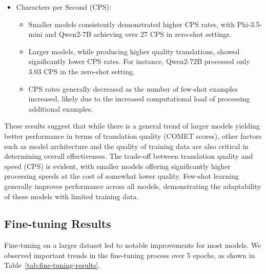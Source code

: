 \documentclass[conference]{IEEEtran}
\begin{document}
\begin{itemize}
    \item Characters per Second (CPS):
    \begin{itemize}
        \item Smaller models consistently demonstrated higher CPS rates, with Phi-3.5-mini and Qwen2-7B achieving over 27 CPS in zero-shot settings.
        \item Larger models, while producing higher quality translations, showed significantly lower CPS rates. For instance, Qwen2-72B processed only 3.03 CPS in the zero-shot setting.
        \item CPS rates generally decreased as the number of few-shot examples increased, likely due to the increased computational load of processing additional examples.
    \end{itemize}
\end{itemize}

These results suggest that while there is a general trend of larger models yielding better performance in terms of translation quality (COMET scores), other factors such as model architecture and the quality of training data are also critical in determining overall effectiveness. The trade-off between translation quality and speed (CPS) is evident, with smaller models offering significantly higher processing speeds at the cost of somewhat lower quality. Few-shot learning generally improves performance across all models, demonstrating the adaptability of these models with limited training data.

\subsection{Fine-tuning Results}

Fine-tuning on a larger dataset led to notable improvements for most models. We observed important trends in the fine-tuning process over 5 epochs, as shown in Table~\ref{tab:fine-tuning-results}.
\end{document}
